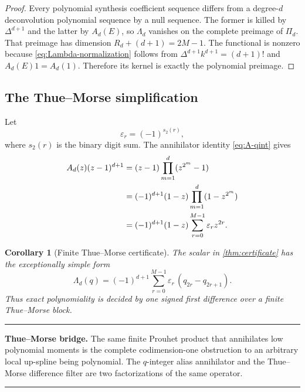\documentclass[11pt,oneside]{article}
\newtheorem{corollary}[theorem]{Corollary}
\theoremstyle{definition}
\theoremstyle{remark}
\newcommand{\eps}{\varepsilon}
\newenvironment{resultbox}{%
  \par\smallskip\noindent\begin{center}\begin{minipage}{0.94\textwidth}%
  \color{black}\hrule\vspace{0.55em}\small
}{%
  \vspace{0.55em}\hrule\end{minipage}\end{center}\smallskip
}
\begin{document}
\begin{proof}
Every polynomial synthesis coefficient sequence differs from a degree-$d$ deconvolution polynomial sequence by a null sequence.  The former is killed by $\Delta^{d+1}$ and the latter by $A_d(E)$, so $\Lambda_d$ vanishes on the complete preimage of $\Pi_d$.  That preimage has dimension
\(
 R_d+(d+1)=2M-1.
\)
The functional is nonzero because \eqref{eq:Lambda-normalization} follows from $\Delta^{d+1}k^{d+1}=(d+1)!$ and $A_d(E)1=A_d(1)$.  Therefore its kernel is exactly the polynomial preimage.
\end{proof}

\subsection{The Thue--Morse simplification}
Let
\begin{equation}
 \eps_r=(-1)^{s_2(r)},                                    \label{eq:TM-sign}
\end{equation}
where $s_2(r)$ is the binary digit sum.  The annihilator identity \eqref{eq:A-qint} gives
\begin{align}
 A_d(z)(z-1)^{d+1}
 &=(z-1)\prod_{m=1}^{d}(z^{2^m}-1)\notag\\
 &=(-1)^{d+1}(1-z)
   \prod_{m=1}^{d}(1-z^{2^m})\notag\\
 &=(-1)^{d+1}(1-z)
   \sum_{r=0}^{M-1}\eps_r z^{2r}.                        \label{eq:TM-factor}
\end{align}

\begin{corollary}[Finite Thue--Morse certificate]
\label{cor:TM-certificate}
The scalar in \cref{thm:certificate} has the exceptionally simple form
\begin{equation}
 \boxed{
 \Lambda_d(q)=(-1)^{d+1}
 \sum_{r=0}^{M-1}\eps_r\,(q_{2r}-q_{2r+1}).}             \label{eq:TM-certificate}
\end{equation}
Thus exact polynomiality is decided by one signed first difference over a finite Thue--Morse block.
\end{corollary}

\begin{resultbox}
\textbf{Thue--Morse bridge.}  The same finite Prouhet product that annihilates low polynomial moments is the complete codimension-one obstruction to an arbitrary local up-spline being polynomial.  The $q$-integer alias annihilator and the Thue--Morse difference filter are two factorizations of the same operator.
\end{resultbox}
\end{document}
